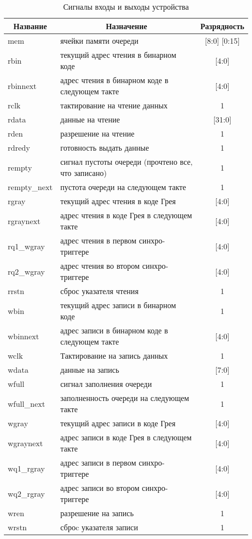 \begin{table}[h!]
	\fontsize{12}{16pt}\selectfont
	\centering
	\caption{Сигналы входы и выходы устройства}
	\label{tab:sig-ports}
	\begin{tabular}{|l|l|c|}
		\hline
		\multicolumn{1}{|c}{\textbf{Название}} & \multicolumn{1}{|c|}{\textbf{Назначение}} & \multicolumn{1}{c|}{\textbf{Разрядность}} \\ \hline
		mem  &  ячейки памяти очереди & [8:0] [0:15] \\ \hline
		rbin  &  текущий адрес чтения в бинарном коде & [4:0] \\ \hline
		rbinnext  &  адрес чтения в бинарном коде в следующем такте & [4:0] \\ \hline
		rclk  &  тактирование на чтение данных & 1 \\ \hline
		rdata  &  данные на чтение & [31:0] \\ \hline
		rden  &  разрешение на чтение & 1 \\ \hline
		rdredy  &  готовность выдать данные & 1 \\ \hline
		rempty  &  сигнал пустоты очереди (прочтено все, что записано) & 1 \\ \hline
		rempty\_next  &  пустота очереди на следующем такте & 1 \\ \hline
		rgray  &  текущий адрес чтения в коде Грея & [4:0] \\ \hline
		rgraynext  &  адрес чтения в коде Грея в следующем такте & [4:0] \\ \hline
		rq1\_wgray  &  адрес чтения в первом синхро-триггере & [4:0] \\ \hline
		rq2\_wgray  &  адрес чтения во втором синхро-триггере & [4:0] \\ \hline
		rrstn  &  сброс указателя чтения & 1 \\ \hline
		wbin  &  текущий адрес записи в бинарном коде & 1 \\ \hline
		wbinnext  &  адрес записи в бинарном коде в следующем такте & [4:0] \\ \hline
		wclk  &  Тактирование на запись данных & 1 \\ \hline
		wdata  &  данные на запись & [7:0] \\ \hline
		wfull  &  сигнал заполнения очереди & 1 \\ \hline
		wfull\_next  &  заполненность очереди на следующем такте & 1 \\ \hline
		wgray  &  текущий адрес записи в коде Грея & [4:0] \\ \hline
		wgraynext  &  адрес записи в коде Грея в следующем такте & [4:0] \\ \hline
		wq1\_rgray  &  адрес записи в первом синхро-триггере & [4:0] \\ \hline
		wq2\_rgray  &  адрес записи во втором синхро-триггере & [4:0] \\ \hline
		wren  &  разрешение на запись & 1 \\ \hline
		wrstn  &  сброc указателя записи & 1 \\ \hline
	\end{tabular}
\end{table}
\normalsize
\clearpage







\clearpage